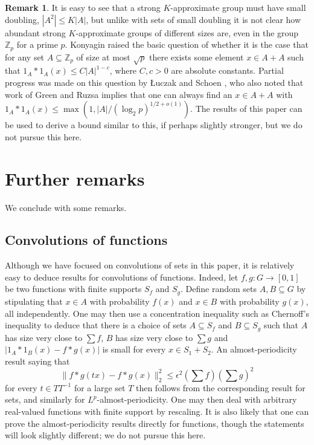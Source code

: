 \documentclass[12pt,a4paper,reqno]{amsart}
\numberwithin{equation}{section}
\theoremstyle{plain}
\theoremstyle{definition}
\newtheorem{remark}[theorem]{Remark}
\renewcommand{\leq}{\leqslant}
\renewcommand{\subset}{\subseteq}
\def\Z{\mathbb{Z}}
\DeclareMathOperator{\ssum}{\textstyle{\sum\nolimits}}
\newcommand{\Zmod}[1]{\Z_#1} %
\providecommand{\norm}[1]{\lVert#1\rVert}
\begin{document}
\begin{remark}
It is easy to see that a strong $K$-approximate group must have small doubling, $|A^2| \leq K|A|$, but unlike with sets of small doubling it is not clear how abundant strong $K$-approximate groups of different sizes are, even in the group $\Zmod{p}$ for a prime $p$. Konyagin \cite[Problem 5]{lev:rep-functions} raised the basic question of whether it is the case that for any set $A \subset \Zmod{p}$ of size at most $\sqrt{p}$ there exists some element $x \in A+A$ such that $1_A*1_A(x) \leq C |A|^{1-c}$, where $C, c>0$ are absolute constants. Partial progress was made on this question by \L uczak and Schoen \cite{luczak-schoen}, who also noted that work of Green and Ruzsa \cite{green-ruzsa:rectification} implies that one can always find an $x \in A+A$ with $1_A*1_A(x) \leq \max(1, |A|/(\log_2 p)^{1/2+o(1)})$. The results of this paper can be used to derive a bound similar to this, if perhaps slightly stronger, but we do not pursue this here.
\end{remark}


\section{Further remarks}\label{remarks}
We conclude with some remarks.

\subsection{Convolutions of functions}
Although we have focused on convolutions of sets in this paper, it is relatively easy to deduce results for convolutions of functions. Indeed, let $f, g : G \to [0,1]$ be two functions with finite supports $S_f$ and $S_g$. Define random sets $A, B \subset G$ by stipulating that $x \in A$ with probability $f(x)$ and $x \in B$ with probability $g(x)$, all independently. One may then use a concentration inequality such as Chernoff's inequality \cite[Theorem 1.8]{tao-vu} to deduce that there is a choice of sets $A \subset S_f$ and $B \subset S_g$ such that $A$ has size very close to $\ssum f$, $B$ has size very close to $\ssum g$ and $|1_A*1_B(x) - f*g(x)|$ is small for every $x \in S_1+S_2$. An almost-periodicity result saying that
\[ \norm{ f*g(tx) - f*g(x) }_2^2 \leq \epsilon^2 \left(\ssum f\right) \left(\ssum g \right)^2 \]
for every $t \in TT^{-1}$ for a large set $T$ then follows from the corresponding result for sets, and similarly for $L^p$-almost-periodicity. One may then deal with arbitrary real-valued functions with finite support by rescaling. It is also likely that one can prove the almost-periodicity results directly for functions, though the statements will look slightly different; we do not pursue this here.
\end{document}
